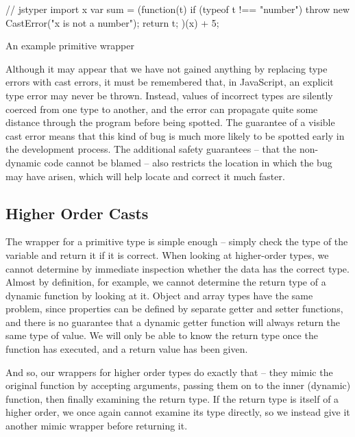\documentclass[12pt,a4paper,twoside,openright]{report}
\theoremstyle{definition}
\theoremstyle{dotless}
\begin{document}
\begin{listing}
  \begin{jscript}
	// jstyper import x
	var sum = (function(t) {
	  if (typeof t !== "number") 
	  throw new CastError("x is not a number");
	  return t;
	})(x) + 5;
  \end{jscript}
  \caption{An example primitive wrapper}\label{lst:importPrim}
\end{listing}
Although it may appear that we have not gained anything by replacing type
errors with cast errors, it must be remembered that, in JavaScript, an explicit
type error may never be thrown. Instead, values of incorrect types are silently
coerced from one type to another, and the error can propagate quite some
distance through the program before being spotted. The guarantee of a visible
cast error means that this kind of bug is much more likely to be spotted early
in the development process. The additional safety guarantees -- that the
non-dynamic code cannot be blamed -- also restricts the location in which the bug
may have arisen, which will help locate and correct it much faster.

\subsection{Higher Order Casts}

The wrapper for a primitive type is simple enough -- simply check the type of
the variable and return it if it is correct. When looking at higher-order
types, we cannot determine by immediate inspection whether the data has the
correct type. Almost by definition, for example, we cannot determine the return
type of a dynamic function by looking at it. Object and array types have the
same problem, since properties can be defined by separate getter and setter
functions, and there is no guarantee that a dynamic getter function will always
return the same type of value. We will only be able to know the return type
once the function has executed, and a return value has been given.

And so, our wrappers for higher order types do exactly that -- they mimic the
original function by accepting arguments, passing them on to the inner
(dynamic) function, then finally examining the return type. If the return type
is itself of a higher order, we once again cannot examine its type directly, so
we instead give it another mimic wrapper before returning it. 
\end{document}
